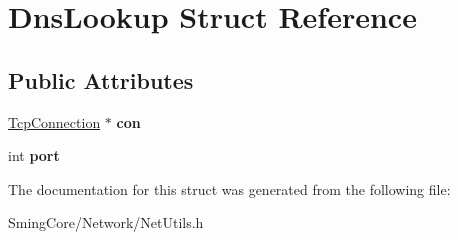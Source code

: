 \hypertarget{struct_dns_lookup}{}\section{Dns\+Lookup Struct Reference}
\label{struct_dns_lookup}
\subsection*{Public Attributes}
\begin{DoxyCompactItemize}
\item 
\hypertarget{struct_dns_lookup_a2dec6ffc62c9f47e2bbbca31eaed2331}{}\hyperlink{class_tcp_connection}{Tcp\+Connection} $\ast$ {\bfseries con}\label{struct_dns_lookup_a2dec6ffc62c9f47e2bbbca31eaed2331}

\item 
\hypertarget{struct_dns_lookup_a6d7ab4b2930160344759a00c0f37d3b3}{}int {\bfseries port}\label{struct_dns_lookup_a6d7ab4b2930160344759a00c0f37d3b3}

\end{DoxyCompactItemize}


The documentation for this struct was generated from the following file\+:\begin{DoxyCompactItemize}
\item 
Sming\+Core/\+Network/Net\+Utils.\+h\end{DoxyCompactItemize}
